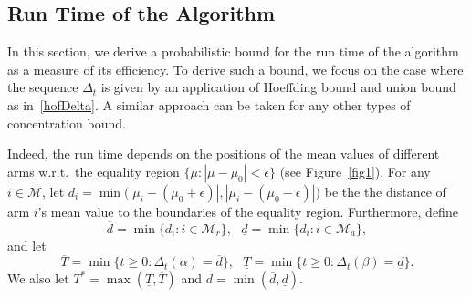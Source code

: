 \documentclass[12pt]{article}
\def\MM{\mathcal{M}}
\def\d{\overline{d}}
\def\dd{\underline{d}}
\def\T{\overline{T}}
\def\TT{\underline{T}}
\begin{document}
\subsection{Run Time of the Algorithm}
In this section, we derive a probabilistic bound for the run time of the algorithm as a measure of its efficiency. To derive such a bound, we focus on the case where the sequence $\Delta_t$ is given by an application of Hoeffding bound and union bound as in~\eqref{hofDelta}. A similar approach can be taken for any other types of concentration bound.

Indeed, the run time depends on the positions of the mean values of different arms w.r.t.~the equality region $\{\mu:|\mu-\mu_0|<\epsilon\}$ (see Figure~\ref{fig1}). For any $i\in\MM$, let $d_i = \min\Big(|\mu_i - (\mu_0+\epsilon)|,|\mu_i - (\mu_0-\epsilon)|\Big)$ be the the distance of arm $i$'s mean value to the boundaries of the  equality region. Furthermore, define 
\begin{equation}
\label{dd}
\d = \min\big\{d_i:i\in\MM_r\big\},~~~\dd = \min\big\{d_i:i\in\MM_a\big\},
\end{equation}
and let 
\begin{equation}
\label{TT}
\T = \min\big\{t\geq 0:\Delta_t(\alpha) = \d\big\},~~~\TT = \min\big\{t\geq 0:\Delta_t(\beta) =  \dd\big\}.
\end{equation}
We also let $T^* = \max(\TT,\T)$ and $d = \min(\d,\dd)$. 
\end{document}
